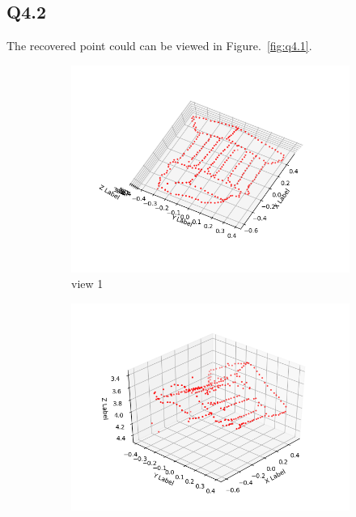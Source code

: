 \documentclass[11pt]{article}
\begin{document}
\newpage

\subsection*{Q4.2}

The recovered point could can be viewed in Figure.~\ref{fig:q4.1}. 

\begin{figure}[h!]
    \begin{subfigure}{.49\textwidth}
      \centering
      \includegraphics[width=.95\linewidth]{../results/q4_2_1.png}
      \caption{view 1}
    \end{subfigure}
    \begin{subfigure}{.49\textwidth}
      \centering
      \includegraphics[width=.95\linewidth]{../results/q4_2_2.png}

\end{subfigure}
\end{figure}
\end{document}
